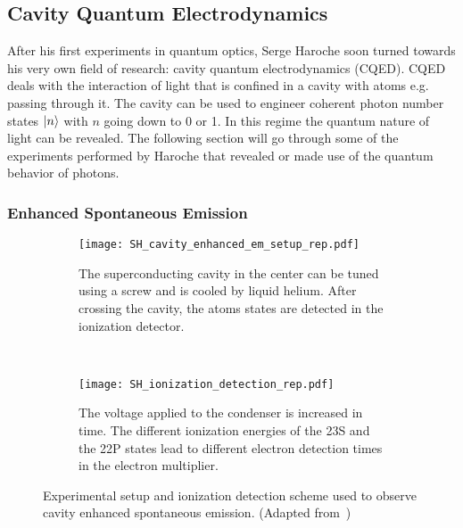 \subsection{Cavity Quantum Electrodynamics}
\label{sec:CQED}
After his first experiments in quantum optics, Serge Haroche soon turned towards
his very own field of research: cavity quantum electrodynamics (CQED). CQED
deals with the interaction of light that is confined in a cavity with atoms
e.g. passing through it. The cavity can be used to engineer coherent photon number
states $\ket{n}$ with $n$ going down to 0 or 1. In this regime the quantum
nature of light can be revealed. The following section will go through some of
the experiments performed by Haroche that revealed or made use of the quantum
behavior of photons. 

\subsubsection{Enhanced Spontaneous Emission}
\label{sec:EnhancedSpontEm}

\begin{figure}[t]
  \centering
  \begin{subfigure}[t]{0.48\linewidth}
    \centering
    \texttt{[image: SH\_cavity\_enhanced\_em\_setup\_rep.pdf]}
    \caption{The superconducting cavity in the center can be tuned using a screw
    and is cooled by liquid helium. After crossing the cavity, the atoms states
  are detected in the ionization detector.}
    \label{fig:cavity_enhanced_setup}
  \end{subfigure}
  ~
  \begin{subfigure}[t]{0.48\linewidth}
    \centering
    \texttt{[image: SH\_ionization\_detection\_rep.pdf]}
    \caption{The voltage applied to the condenser is increased in time. The
    different ionization energies of the 23S and the 22P states lead to
  different electron detection times in the electron multiplier.}
    \label{fig:ionization_detection}
  \end{subfigure}
  \caption{Experimental setup and ionization detection scheme used to observe
  cavity enhanced spontaneous emission. (Adapted
from~\cite{haroche1983EnhancedSpontEm})}
  \label{}
\end{figure}

